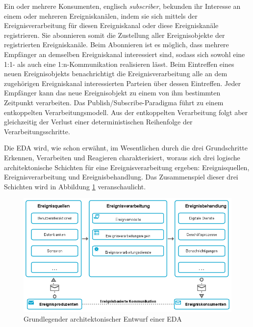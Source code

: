 Ein oder mehrere Konsumenten, englisch \textit{subscriber}, bekunden ihr Interesse an einem oder mehreren Ereigniskanälen, indem sie sich mittels der Ereignisverarbeitung für diesen Ereigniskanal oder diese Ereigniskanäle registrieren. 
Sie abonnieren somit die Zustellung aller Ereignisobjekte der registrierten Ereigniskanäle.
Beim Abonnieren ist es möglich, dass mehrere Empfänger an demselben Ereigniskanal interessiert sind, sodass sich sowohl eine 1:1- als auch eine 1:n-Kommunikation realisieren lässt. 
Beim Eintreffen eines neuen Ereignisobjekts benachrichtigt die Ereignisverarbeitung alle an dem zugehörigen Ereigniskanal interessierten Parteien über dessen Eintreffen. 
Jeder Empfänger kann das neue Ereignisobjekt zu einem von ihm bestimmten Zeitpunkt verarbeiten.
\cite{Schaaf.2015}
Das Publish/Subscribe-Paradigma führt zu einem entkoppelten Verarbeitungsmodell. Aus der entkoppelten Verarbeitung folgt aber gleichzeitig der Verlust einer deterministischen Reihenfolge der Verarbeitungsschritte.
\cite{Bruns.2010}

Die \ac{EDA} wird, wie schon erwähnt, im Wesentlichen durch die drei Grundschritte Erkennen, Verarbeiten und Reagieren charakterisiert, woraus sich drei logische architektonische Schichten für eine Ereignisverarbeitung ergeben: Ereignisquellen, Ereignisverarbeitung und Ereignisbehandlung. Das
Zusammenspiel dieser drei Schichten wird  in Abbildung \ref{fig:Grundlegender architektonischer Entwurf einer EDA} veranschaulicht.

\begin{figure}[H]
	\centering 
    \includegraphics[width=\textwidth]{img/Ereignisverarbitungablauf.png}	
    \caption[Grundlegender architektonischer Entwurf einer EDA]
    {Grundlegender architektonischer Entwurf einer EDA \protect\footnotemark}
    \label{fig:Grundlegender architektonischer Entwurf einer EDA}
\end{figure}

